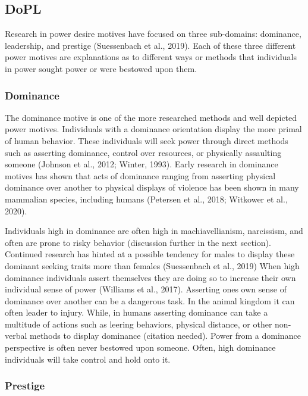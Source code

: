 \documentclass[
  english,
  a4paper]{apa7}
\begin{document}
\hypertarget{dopl}{%
\subsection{DoPL}\label{dopl}}

Research in power desire motives have focused on three sub-domains: dominance, leadership, and prestige (Suessenbach et al., 2019). Each of these three different power motives are explanations as to different ways or methods that individuals in power sought power or were bestowed upon them.

\hypertarget{dominance}{%
\subsubsection{Dominance}\label{dominance}}

The dominance motive is one of the more researched methods and well depicted power motives. Individuals with a dominance orientation display the more primal of human behavior. These individuals will seek power through direct methods such as asserting dominance, control over resources, or physically assaulting someone (Johnson et al., 2012; Winter, 1993). Early research in dominance motives has shown that acts of dominance ranging from asserting physical dominance over another to physical displays of violence has been shown in many mammalian species, including humans (Petersen et al., 2018; Witkower et al., 2020).

Individuals high in dominance are often high in machiavellianism, narcissism, and often are prone to risky behavior (discussion further in the next section). Continued research has hinted at a possible tendency for males to display these dominant seeking traits more than females (Suessenbach et al., 2019) When high dominance individuals assert themselves they are doing so to increase their own individual sense of power (Williams et al., 2017). Asserting ones own sense of dominance over another can be a dangerous task. In the animal kingdom it can often leader to injury. While, in humans asserting dominance can take a multitude of actions such as leering behaviors, physical distance, or other non-verbal methods to display dominance (citation needed). Power from a dominance perspective is often never bestowed upon someone. Often, high dominance individuals will take control and hold onto it.

\hypertarget{prestige}{%
\subsubsection{Prestige}\label{prestige}}
\end{document}
